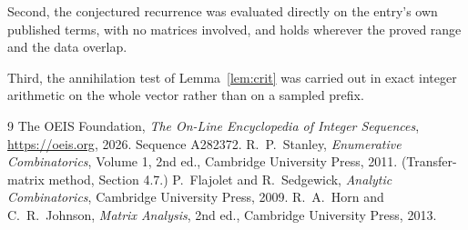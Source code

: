 \documentclass[11pt,a4paper]{article}
\theoremstyle{plain}
\theoremstyle{definition}
\begin{document}
Second, the conjectured recurrence was evaluated directly on the entry's own published terms,
with no matrices involved, and holds wherever the proved range and the data overlap.

Third, the annihilation test of Lemma~\ref{lem:crit} was carried out in exact integer
arithmetic on the whole vector rather than on a sampled prefix.

\begin{thebibliography}{9}
 The OEIS Foundation, \emph{The On-Line Encyclopedia of Integer
Sequences}, \url{https://oeis.org}, 2026. Sequence A282372.
 R.~P.~Stanley, \emph{Enumerative Combinatorics}, Volume 1, 2nd ed.,
Cambridge University Press, 2011. (Transfer-matrix method, Section 4.7.)
 P.~Flajolet and R.~Sedgewick, \emph{Analytic Combinatorics}, Cambridge
University Press, 2009.
 R.~A.~Horn and C.~R.~Johnson, \emph{Matrix Analysis}, 2nd ed., Cambridge
University Press, 2013.
\end{thebibliography}
\end{document}
